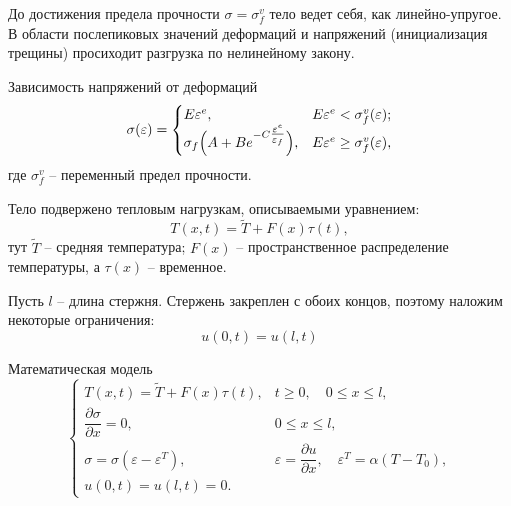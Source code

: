 \documentclass[unicode]{beamer}
\begin{document}
    \begin{frame}
        До достижения предела прочности $\sigma = \sigma_f^v$ тело ведет себя, как линейно-упругое. В области послепиковых значений деформаций и напряжений (инициализация трещины) просиходит разгрузка по нелинейному закону. 

        \vspace{0.7em}

        \begin{block}{Зависимость напряжений от деформаций}
            \[
                \sigma(\varepsilon) = 
                    \begin{cases}
                    E\varepsilon^e, & E\varepsilon^e < \sigma_f^v(\varepsilon); \\
                    \sigma_f \Bigl( A + B e^{-C \tfrac{\varepsilon^e}{\varepsilon_f}} \Bigr), & E\varepsilon^e \geq \sigma_f^v(\varepsilon),
                    \end{cases}
                \label{sigma}
            \]
            \noindent где $\sigma_f^v$ -- переменный предел прочности. 
        \end{block}

        \vspace{0.7em}

        Тело подвержено тепловым нагрузкам, описываемыми уравнением:
        \[
          T(x,t) = \tilde{T} + F(x)\tau(t),  
        \]
        \noindent тут $\tilde{T}$ -- средняя температура; $F(x)$ -- пространственное распределение температуры, а $\tau(x)$ -- временное.
    \end{frame}

    \begin{frame}
        Пусть $l$ -- длина стержня. Стержень закреплен с обоих концов, поэтому наложим некоторые ограничения:
        \[
          u(0, t) = u(l, t)  
        \]

        \begin{block}{Математическая модель}
            \[
                \begin{cases}
                    T(x, t) = \widetilde{T} + F(x) \tau(t), & t \geq 0, \quad 0 \leq x \leq l, \\[0.7em]
                    \dfrac{\partial \sigma}{\partial x} = 0, & 0 \leq x \leq l, \\[0.7em]
                    \sigma = \sigma(\varepsilon - \varepsilon^T), & \varepsilon = \dfrac{\partial u}{\partial x}, \quad \varepsilon^T = \alpha(T - T_0), \\[0.7em]
                    u(0, t) = u(l, t) = 0.
                  \end{cases}  
            \]
        \end{block}
    \end{frame}
\end{document}
